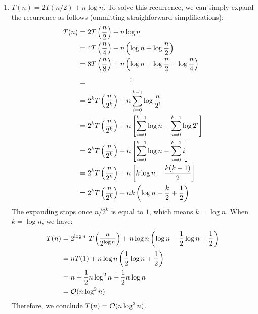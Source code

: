 \documentclass{article}
\begin{document}
\begin{enumerate}[leftmargin={*}, font={\bf}, label={\arabic*.}, ref={\arabic*}]
\begin{enumerate}
      \item \label{qst:3c}
        $T(n) = 2T(n/2) + n\log n$. To solve this recurrence, we can simply expand the recurrence
        as follows (ommitting straighforward simplifications):
        \begin{align*}
          T(n) &= 2T\left(\frac{n}{2}\right) + n\log n \\
               &= 4T\left(\frac{n}{4}\right) + n\left(\log n + \log \frac{n}{2}\right) \\
               &= 8T\left(\frac{n}{8}\right) + n\left(\log n + \log \frac{n}{2} + \log \frac{n}{4}\right) \\
               &= \hspace{21mm}\vdots \\
               &= 2^kT\left(\frac{n}{2^k}\right) + n \sum_{i=0}^{k-1} \log \frac{n}{2^i} \\
               &= 2^kT\left(\frac{n}{2^k}\right) + n \left[\sum_{i=0}^{k-1} \log n - \sum_{i=0}^{k-1} \log 2^i\right] \\
               &= 2^kT\left(\frac{n}{2^k}\right) + n \left[\sum_{i=0}^{k-1} \log n - \sum_{i=0}^{k-1} i\right] \\
               &= 2^kT\left(\frac{n}{2^k}\right) + n \left[k\log n - \frac{k(k-1)}{2}\right] \\
               &= 2^kT\left(\frac{n}{2^k}\right) + nk\left(\log n - \frac{k}{2} + \frac{1}{2}\right)
        \end{align*}
        The expanding stops once $n/2^k$ is equal to $1$, which means $k = \log n$. When $k = \log
        n$, we have:
        \begin{align*}
          T(n) &= 2^{\log n}\ T\left(\frac{n}{2^{\log n}}\right) + n\log n\left(\log n - \frac{1}{2}\log n + \frac{1}{2}\right) \\
               &= nT(1) + n\log n \left(\frac{1}{2}\log n + \frac{1}{2}\right) \\
               &= n + \frac{1}{2}n\log^2 n  + \frac{1}{2} n\log n \\
               &= \operatorname*{\mathcal{O}}(n\log^2 n)
        \end{align*}
        Therefore, we conclude $T(n) = \operatorname*{\mathcal{O}}(n\log^2 n)$.


\end{enumerate}
\end{enumerate}
\end{document}
